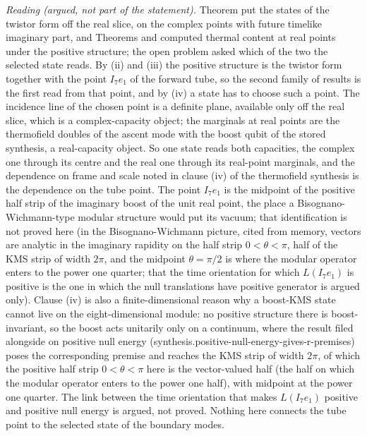 \emph{Reading (argued, not part of the statement).} Theorem  put the states of the twistor form off the real slice, on the complex points with future timelike imaginary part, and Theorems  and  computed thermal content at real points under the positive structure; the open problem asked which of the two the selected state reads. By (ii) and (iii) the positive structure is the twistor form together with the point $I_{7}e_{1}$ of the forward tube, so the second family of results is the first read from that point, and by (iv) a state has to choose such a point. The incidence line of the chosen point is a definite plane, available only off the real slice, which is a complex-capacity object; the marginals at real points are the thermofield doubles of the ascent mode with the boost qubit of the stored synthesis, a real-capacity object. So one state reads both capacities, the complex one through its centre and the real one through its real-point marginals, and the dependence on frame and scale noted in clause (iv) of the thermofield synthesis is the dependence on the tube point. The point $I_{7}e_{1}$ is the midpoint of the positive half strip of the imaginary boost of the unit real point, the place a Bisognano-Wichmann-type modular structure would put its vacuum; that identification is not proved here (in the Bisognano-Wichmann picture, cited from memory, vectors are analytic in the imaginary rapidity on the half strip $0 < \theta < \pi$, half of the KMS strip of width $2\pi$, and the midpoint $\theta = \pi/2$ is where the modular operator enters to the power one quarter; that the time orientation for which $L(I_{7}e_{1})$ is positive is the one in which the null translations have positive generator is argued only). Clause (iv) is also a finite-dimensional reason why a boost-KMS state cannot live on the eight-dimensional module: no positive structure there is boost-invariant, so the boost acts unitarily only on a continuum, where the result filed alongside on positive null energy (synthesis.positive-null-energy-gives-r-premises) poses the corresponding premise and reaches the KMS strip of width $2\pi$, of which the positive half strip $0 < \theta < \pi$ here is the vector-valued half (the half on which the modular operator enters to the power one half), with midpoint at the power one quarter. The link between the time orientation that makes $L(I_{7}e_{1})$ positive and positive null energy is argued, not proved. Nothing here connects the tube point to the selected state of the boundary modes.
